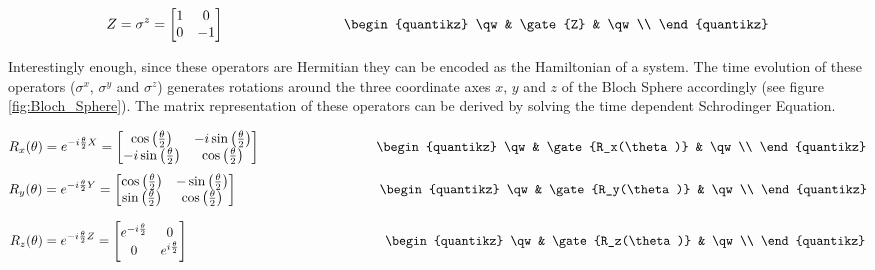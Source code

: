 \documentclass[12pt,a4paper]{report}
\begin{document}
\[
Z = \sigma^z = \begin{bmatrix}
1 & 0 \\
0 & -1 \\
\end{bmatrix}
\hspace{3cm}
\begin{quantikz}
\qw & \gate{Z} & \qw \\
\end{quantikz}
\]

\noindent
Interestingly enough, since these operators are Hermitian they can be encoded as the Hamiltonian of a system. The time evolution of these operators (\(\sigma^x\), \(\sigma^y\) and \(\sigma^z\)) generates rotations around the three coordinate axes \(x\), \(y\) and \(z\) of the Bloch Sphere accordingly (see figure \ref{fig:Bloch_Sphere}). The matrix representation of these operators can be derived by solving the time dependent Schrodinger Equation.

\[
R_x(\theta) = e^{-i \frac{\theta}{2} X} = \begin{bmatrix}
\cos\left(\frac{\theta}{2}\right) & -i \sin\left(\frac{\theta}{2}\right) \\
-i \sin\left(\frac{\theta}{2}\right) & \cos\left(\frac{\theta}{2}\right) \\
\end{bmatrix}
\hspace{3cm}
\begin{quantikz}
\qw & \gate{R_x(\theta)} & \qw \\
\end{quantikz}
\]
\[
R_y(\theta) = e^{-i \frac{\theta}{2} Y} = \begin{bmatrix}
\cos\left(\frac{\theta}{2}\right) & -\sin\left(\frac{\theta}{2}\right) \\
\sin\left(\frac{\theta}{2}\right) & \cos\left(\frac{\theta}{2}\right) \\
\end{bmatrix}
\hspace{3.7cm}
\begin{quantikz}
\qw & \gate{R_y(\theta)} & \qw \\
\end{quantikz}
\]

\[
R_z(\theta) = e^{-i \frac{\theta}{2} Z} = \begin{bmatrix}
e^{-i \frac{\theta}{2}} & 0 \\
0 & e^{i \frac{\theta}{2}} \\
\end{bmatrix}
\hspace{5.2cm}
\begin{quantikz}
\qw & \gate{R_z(\theta)} & \qw \\
\end{quantikz}
\]
\end{document}
